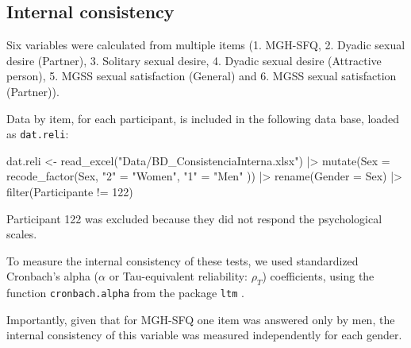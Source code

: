 \documentclass[
  bookmarksnumbered]{article}
\newenvironment{Shaded}{\begin{snugshade}}{\end{snugshade}}
\newcommand{\AttributeTok}[1]{\textcolor[rgb]{0.80,0.80,0.80}{#1}}
\newcommand{\DecValTok}[1]{\textcolor[rgb]{0.86,0.86,0.80}{#1}}
\newcommand{\FunctionTok}[1]{\textcolor[rgb]{0.94,0.94,0.56}{#1}}
\newcommand{\NormalTok}[1]{\textcolor[rgb]{0.80,0.80,0.80}{#1}}
\newcommand{\OtherTok}[1]{\textcolor[rgb]{0.94,0.94,0.56}{#1}}
\newcommand{\SpecialCharTok}[1]{\textcolor[rgb]{0.86,0.64,0.64}{#1}}
\newcommand{\StringTok}[1]{\textcolor[rgb]{0.80,0.58,0.58}{#1}}
\begin{document}
\subsection{Internal consistency}\label{internal-consistency}

Six variables were calculated from multiple items (1. MGH-SFQ, 2. Dyadic sexual desire (Partner), 3. Solitary sexual desire, 4. Dyadic sexual desire (Attractive person), 5. MGSS sexual satisfaction (General) and 6. MGSS sexual satisfaction (Partner)).

Data by item, for each participant, is included in the following data base, loaded as \texttt{dat.reli}:

\begin{Shaded}
\begin{Highlighting}[]
\NormalTok{dat.reli }\OtherTok{\textless{}{-}} \FunctionTok{read\_excel}\NormalTok{(}\StringTok{"Data/BD\_ConsistenciaInterna.xlsx"}\NormalTok{) }\SpecialCharTok{|\textgreater{}}
  \FunctionTok{mutate}\NormalTok{(}\AttributeTok{Sex =} \FunctionTok{recode\_factor}\NormalTok{(Sex,}
    \StringTok{"2"} \OtherTok{=} \StringTok{"Women"}\NormalTok{,}
    \StringTok{"1"} \OtherTok{=} \StringTok{"Men"}
\NormalTok{  )) }\SpecialCharTok{|\textgreater{}}
  \FunctionTok{rename}\NormalTok{(}\AttributeTok{Gender =}\NormalTok{ Sex) }\SpecialCharTok{|\textgreater{}}
  \FunctionTok{filter}\NormalTok{(Participante }\SpecialCharTok{!=} \DecValTok{122}\NormalTok{)}
\end{Highlighting}
\end{Shaded}

Participant 122 was excluded because they did not respond the psychological scales.

To measure the internal consistency of these tests, we used standardized Cronbach's alpha (\(\alpha\) or Tau-equivalent reliability: \(\rho_{T}\)) coefficients, using the function \texttt{cronbach.alpha} from the package \texttt{ltm} \autocite{LtmPackageLatent2006}.

Importantly, given that for MGH-SFQ one item was answered only by men, the internal consistency of this variable was measured independently for each gender.
\end{document}
